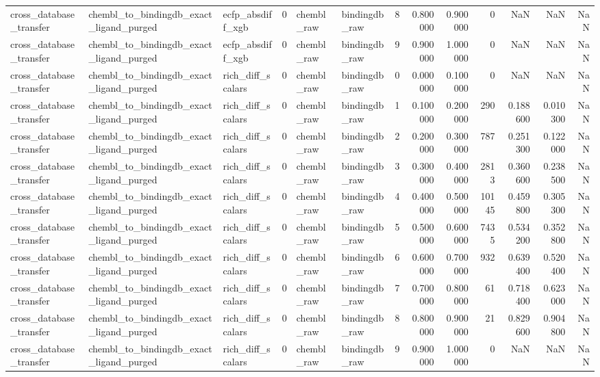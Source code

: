 \begin{longtable}{lllrllrrrrrrr}
cross\_database\_transfer & chembl\_to\_bindingdb\_exact\_ligand\_purged & ecfp\_absdiff\_xgb & 0 & chembl\_raw & bindingdb\_raw & 8 & 0.800000 & 0.900000 & 0 & NaN & NaN & NaN \\
cross\_database\_transfer & chembl\_to\_bindingdb\_exact\_ligand\_purged & ecfp\_absdiff\_xgb & 0 & chembl\_raw & bindingdb\_raw & 9 & 0.900000 & 1.000000 & 0 & NaN & NaN & NaN \\
cross\_database\_transfer & chembl\_to\_bindingdb\_exact\_ligand\_purged & rich\_diff\_scalars & 0 & chembl\_raw & bindingdb\_raw & 0 & 0.000000 & 0.100000 & 0 & NaN & NaN & NaN \\
cross\_database\_transfer & chembl\_to\_bindingdb\_exact\_ligand\_purged & rich\_diff\_scalars & 0 & chembl\_raw & bindingdb\_raw & 1 & 0.100000 & 0.200000 & 290 & 0.188600 & 0.010300 & NaN \\
cross\_database\_transfer & chembl\_to\_bindingdb\_exact\_ligand\_purged & rich\_diff\_scalars & 0 & chembl\_raw & bindingdb\_raw & 2 & 0.200000 & 0.300000 & 787 & 0.251300 & 0.122000 & NaN \\
cross\_database\_transfer & chembl\_to\_bindingdb\_exact\_ligand\_purged & rich\_diff\_scalars & 0 & chembl\_raw & bindingdb\_raw & 3 & 0.300000 & 0.400000 & 2813 & 0.360600 & 0.238500 & NaN \\
cross\_database\_transfer & chembl\_to\_bindingdb\_exact\_ligand\_purged & rich\_diff\_scalars & 0 & chembl\_raw & bindingdb\_raw & 4 & 0.400000 & 0.500000 & 10145 & 0.459800 & 0.305300 & NaN \\
cross\_database\_transfer & chembl\_to\_bindingdb\_exact\_ligand\_purged & rich\_diff\_scalars & 0 & chembl\_raw & bindingdb\_raw & 5 & 0.500000 & 0.600000 & 7435 & 0.534200 & 0.352800 & NaN \\
cross\_database\_transfer & chembl\_to\_bindingdb\_exact\_ligand\_purged & rich\_diff\_scalars & 0 & chembl\_raw & bindingdb\_raw & 6 & 0.600000 & 0.700000 & 932 & 0.639400 & 0.520400 & NaN \\
cross\_database\_transfer & chembl\_to\_bindingdb\_exact\_ligand\_purged & rich\_diff\_scalars & 0 & chembl\_raw & bindingdb\_raw & 7 & 0.700000 & 0.800000 & 61 & 0.718400 & 0.623000 & NaN \\
cross\_database\_transfer & chembl\_to\_bindingdb\_exact\_ligand\_purged & rich\_diff\_scalars & 0 & chembl\_raw & bindingdb\_raw & 8 & 0.800000 & 0.900000 & 21 & 0.829600 & 0.904800 & NaN \\
cross\_database\_transfer & chembl\_to\_bindingdb\_exact\_ligand\_purged & rich\_diff\_scalars & 0 & chembl\_raw & bindingdb\_raw & 9 & 0.900000 & 1.000000 & 0 & NaN & NaN & NaN \\

\end{longtable}
